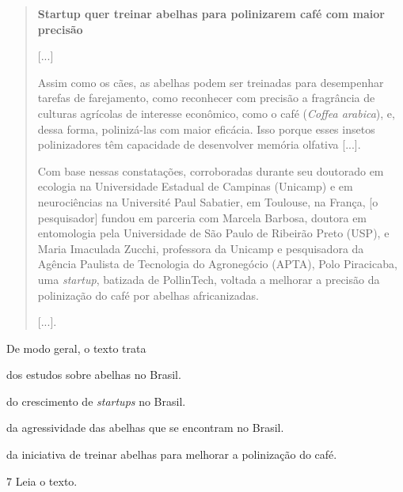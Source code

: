 \begin{quote}
\textbf{Startup quer treinar abelhas para polinizarem café com maior precisão}

{[}...{]}

Assim como os cães, as abelhas podem ser treinadas para desempenhar
tarefas de farejamento, como reconhecer com precisão a fragrância de
culturas agrícolas de interesse econômico, como o café (\textit{Coffea arabica}),
e, dessa forma, polinizá-las com maior eficácia. Isso porque esses
insetos polinizadores têm capacidade de desenvolver memória olfativa
{[}...{]}.

Com base nessas constatações, corroboradas durante seu doutorado em
ecologia na Universidade Estadual de Campinas (Unicamp) e em
neurociências na Université Paul Sabatier, em Toulouse, na França,
[o pesquisador] fundou em parceria com Marcela Barbosa, doutora em entomologia
pela Universidade de São Paulo de Ribeirão Preto (USP), e Maria
Imaculada Zucchi, professora da Unicamp e pesquisadora da Agência
Paulista de Tecnologia do Agronegócio (APTA), Polo Piracicaba, uma
\textit{startup}, batizada de PollinTech, voltada a melhorar a precisão da
polinização do café por abelhas africanizadas.

{[}...{]}.

\end{quote}

De modo geral, o texto trata

\begin{escolha}
\item dos estudos sobre abelhas no Brasil.

\item do crescimento de \textit{startups} no Brasil.

\item da agressividade das abelhas que se encontram no Brasil.

\item da iniciativa de treinar abelhas para melhorar a polinização do café.
\end{escolha}


\num{7} Leia o texto.

